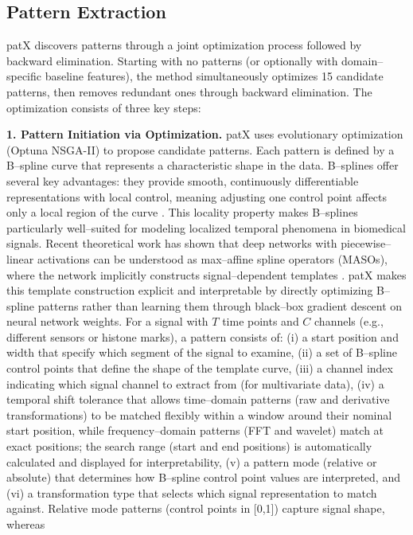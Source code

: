 \documentclass[11pt]{article}
\begin{document}
\subsection{Pattern Extraction}
patX discovers patterns through a joint optimization process followed by
backward elimination.
Starting with no patterns (or optionally with domain--specific baseline
features), the method simultaneously optimizes 15 candidate patterns,
then removes redundant ones through backward elimination.
The optimization consists of three key steps:

\textbf{1. Pattern Initiation via Optimization.}
patX uses evolutionary optimization (Optuna NSGA-II) to propose candidate patterns.
Each pattern is defined by a B--spline curve \cite{balestriero2018spline} that
represents a characteristic shape in the data.
B--splines offer several key advantages: they provide smooth, continuously
differentiable representations with local control, meaning adjusting one
control point affects only a local region of the curve
\cite{balestriero2018spline}.
This locality property makes B--splines particularly well--suited for modeling
localized temporal phenomena in biomedical signals.
Recent theoretical work has shown that deep networks with piecewise--linear
activations can be understood as max--affine spline operators (MASOs), where
the network implicitly constructs signal--dependent templates
\cite{balestriero2018spline}.
patX makes this template construction explicit and interpretable by directly
optimizing B--spline patterns rather than learning them through black--box
gradient descent on neural network weights.
For a signal with $T$ time points and $C$ channels (e.g., different sensors
or histone marks), a pattern consists of:
(i) a start position and width that specify which segment of the signal to
examine,
(ii) a set of B--spline control points that define the shape of the template
curve,
(iii) a channel index indicating which signal channel to extract from (for
multivariate data),
(iv) a temporal shift tolerance that allows time--domain patterns (raw and
derivative transformations) to be matched flexibly within a window around their
nominal start position, while frequency--domain patterns (FFT and wavelet) match
at exact positions; the search range (start and end positions) is automatically
calculated and displayed for interpretability,
(v) a pattern mode (relative or absolute) that determines how B--spline control
point values are interpreted, and
(vi) a transformation type that selects which signal representation to match
against.
Relative mode patterns (control points in [0,1]) capture signal shape, whereas
\end{document}
